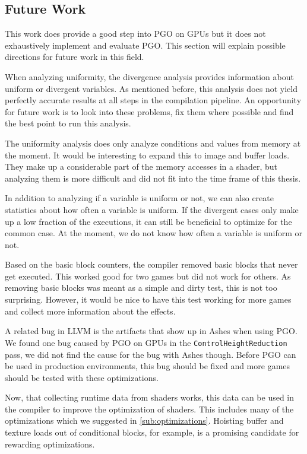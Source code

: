 \subsection{Future Work}
\label{sub:futurework}
This work does provide a good step into PGO on GPUs but it does not exhaustively implement and evaluate PGO.
This section will explain possible directions for future work in this field.

When analyzing uniformity, the divergence analysis provides information about uniform or divergent variables.
As mentioned before, this analysis does not yield perfectly accurate results at all steps in the compilation pipeline.
An opportunity for future work is to look into these problems, fix them where possible and find the best point to run this analysis.

The uniformity analysis does only analyze conditions and values from memory at the moment.
It would be interesting to expand this to image and buffer loads.
They make up a considerable part of the memory accesses in a shader, but analyzing them is more difficult and did not fit into the time frame of this thesis.

In addition to analyzing if a variable is uniform or not, we can also create statistics about how often a variable is uniform.
If the divergent cases only make up a low fraction of the executions, it can still be beneficial to optimize for the common case.
At the moment, we do not know how often a variable is uniform or not.

Based on the basic block counters, the compiler removed basic blocks that never get executed.
This worked good for two games but did not work for others.
As removing basic blocks was meant as a simple and dirty test, this is not too surprising.
However, it would be nice to have this test working for more games and collect more information about the effects.

A related bug in LLVM is the artifacts that show up in Ashes when using PGO.
We found one bug caused by PGO on GPUs in the \texttt{ControlHeightReduction} pass, we did not find the cause for the bug with Ashes though.
Before PGO can be used in production environments, this bug should be fixed and more games should be tested with these optimizations.

Now, that collecting runtime data from shaders works, this data can be used in the compiler to improve the optimization of shaders.
This includes many of the optimizations which we suggested in \cref{sub:optimizations}.
Hoisting buffer and texture loads out of conditional blocks, for example, is a promising candidate for rewarding optimizations.

